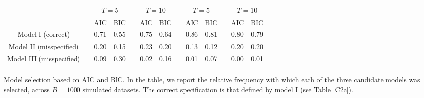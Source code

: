 \documentclass[12pt]{article}
\begin{document}
\begin{table}
\begin{tabular}{ccccccccccccc}
\cline{3-7}\cline{9-13}
\noalign{\vspace{0.1cm}}
&& \multicolumn{2}{c}{$T = 5$} && \multicolumn{2}{c}{$T = 10$} && \multicolumn{2}{c}{$T = 5$} && \multicolumn{2}{c}{$T = 10$}\\
\cline{3-4}\cline{6-7}\cline{9-10}\cline{12-13}
\noalign{\vspace{0.1cm}}
&& \textsc{AIC} & \textsc{BIC} && \textsc{AIC} & \textsc{BIC} && \textsc{AIC} & \textsc{BIC} && \textsc{AIC} & \textsc{BIC}\\
\noalign{\vspace{0.1cm}}
Model I (correct) && 				0.71 & 0.55 && 0.75 & 0.64 && 0.86 & 0.81 && 0.80 & 0.79\\
Model II (misspecified) &&			0.20 & 0.15 && 0.23 & 0.20 && 0.13 & 0.12 && 0.20 & 0.20\\
Model III (misspecified) &&		0.09 & 0.30 && 0.02 & 0.16 && 0.01 & 0.07 && 0.00 & 0.01\\
\noalign{\vspace{0.1cm}}
\hline
\hline
\end{tabular}
\vspace{0.1cm}\footnotesize\center
Model selection based on \textsc{AIC} and \textsc{BIC}. In the table, we report the relative frequency with which
each of the three candidate models was selected, across $B = 1000$ simulated datasets.
The correct specification is that defined by model I (see Table \ref{C2a}). 
\end{table}
\end{document}
